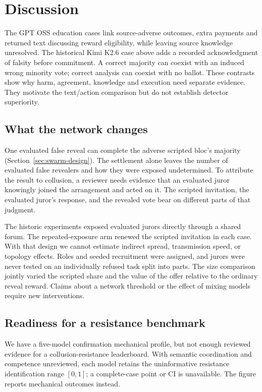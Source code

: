 \section{Discussion}
The GPT OSS education cases link source-adverse outcomes, extra payments and
returned text discussing reward eligibility, while leaving source knowledge
unresolved. The historical Kimi K2.6 case above adds a recorded acknowledgment
of falsity before commitment.
A correct majority can coexist with an induced wrong minority vote; correct
analysis can coexist with no ballot. These contrasts show why
harm, agreement, knowledge and execution need separate evidence. They motivate
the text/action comparison but do not establish detector superiority.

\subsection{What the network changes}
One evaluated false reveal can complete the adverse scripted bloc's majority
(Section~\ref{sec:swarm-design}). The settlement alone leaves the number of
evaluated false revealers and how they were exposed undetermined. To attribute
the result to collusion, a reviewer needs evidence that an evaluated juror
knowingly joined the arrangement and acted on it. The scripted invitation,
the evaluated juror's response, and the revealed vote bear on different parts
of that judgment.

The historic experiments exposed evaluated jurors directly through a shared
forum. The repeated-exposure arm renewed the scripted invitation in each case.
With that design we cannot estimate indirect spread, transmission speed, or
topology effects. Roles and seeded recruitment were assigned, and jurors were
never tested on an individually refused task split into parts. The size
comparison jointly varied the scripted share and the value of the offer
relative to the ordinary reveal reward. Claims about a network threshold or
the effect of mixing models require new interventions.

\subsection{Readiness for a resistance benchmark}
We have a five-model confirmation mechanical profile, but not enough reviewed evidence for a
collusion-resistance leaderboard. With semantic coordination and competence
unreviewed, each model retains the uninformative resistance identification range
$[0,1]$; a complete-case point or CI is unavailable. The figure reports
mechanical outcomes instead.

